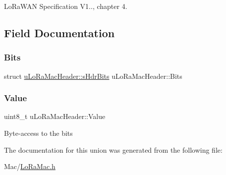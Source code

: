 Lo\+Ra\+W\+AN Specification V1.., chapter 4. 

\subsection{Field Documentation}
\mbox{\label{unionuLoRaMacHeader_a74f0f1fc2a3e7ecae7817e2bdc025eee}} 
\subsubsection{\texorpdfstring{Bits}{Bits}}
{\footnotesize\ttfamily struct \hyperlink{structuLoRaMacHeader_1_1sHdrBits}{u\+Lo\+Ra\+Mac\+Header\+::s\+Hdr\+Bits} u\+Lo\+Ra\+Mac\+Header\+::\+Bits}

\mbox{\label{unionuLoRaMacHeader_aa85438c8c356d6d6c82c611c86a9c7fc}} 
\subsubsection{\texorpdfstring{Value}{Value}}
{\footnotesize\ttfamily uint8\+\_\+t u\+Lo\+Ra\+Mac\+Header\+::\+Value}

Byte-\/access to the bits 

The documentation for this union was generated from the following file\+:\begin{DoxyCompactItemize}
\item 
Mac/\hyperlink{LoRaMac_8h}{Lo\+Ra\+Mac.\+h}\end{DoxyCompactItemize}
